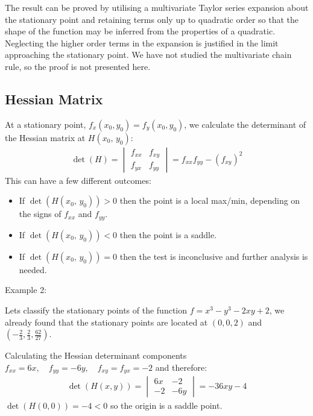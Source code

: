 \documentclass[letterpaper,10pt,english]{jupyterBook}
\begin{document}
\sphinxAtStartPar
The result can be proved by utilising a multivariate Taylor series expansion about the stationary point and retaining terms only up to quadratic order
so that the shape of the function may be inferred from the properties of a quadratic. Neglecting the higher order terms in the expansion is justified in the
limit approaching the stationary point. We have not studied the multivariate chain rule, so the proof is not presented here.


\subsection{Hessian Matrix}
\label{\detokenize{VectorCalculus/partialdifferentiation:hessian-matrix}}
\sphinxAtStartPar
At a stationary point, \(f_x(x_0,y_0)=f_y(x_0,y_0)\), we calculate the determinant of the Hessian matrix at \(H(x_0,\,y_0)\):
\begin{equation*}
\begin{split}\det(H) = \begin{vmatrix}
f_{xx}&f_{xy}\\
f_{yx}&f_{yy}
\end{vmatrix}=f_{xx}f_{yy}-(f_{xy})^2\end{split}
\end{equation*}
\sphinxAtStartPar
This can have a few different outcomes:
\begin{itemize}
\item {} 
\sphinxAtStartPar
If \(\det(H(x_0,\,y_0))>0\) then the point is a local max/min, depending on the signs of \(f_{xx}\) and \(f_{yy}\).

\item {} 
\sphinxAtStartPar
If \(\det(H(x_0,\,y_0))<0\) then the point is a saddle.

\item {} 
\sphinxAtStartPar
If \(\det(H(x_0,\,y_0))=0\) then the test is inconclusive and further analysis is needed.

\end{itemize}

\sphinxAtStartPar
Example 2:

\sphinxAtStartPar
Lets classify the stationary points of the function \(f=x^3-y^3-2xy+2\), we already found that the stationary points are located at \((0,0,2)\) and
\(\left(-\frac{2}{3},\frac{2}{3},\frac{62}{27}\right)\).

\sphinxAtStartPar
Calculating the Hessian determinant components \(f_{xx}=6x, \quad f_{yy}=-6y, \quad f_{xy}=f_{yx}=-2\) and therefore:
\begin{equation*}
\begin{split}\det(H(x,y)) = \begin{vmatrix} 
6x &-2 \\ 
-2 &-6y 
\end{vmatrix}=-36xy-4\end{split}
\end{equation*}
\sphinxAtStartPar
\(\det(H(0,0))=-4<0\) so the origin is a saddle point.
\end{document}
